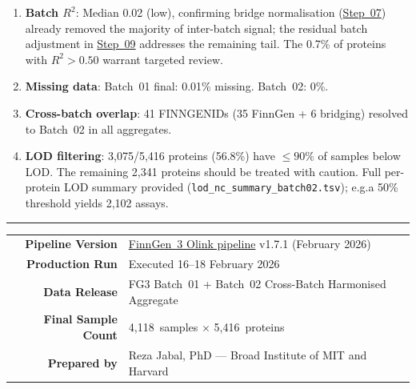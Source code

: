 \documentclass[11pt,a4paper]{article}
\newcommand{\pipelinelink}{%
  \href{https://github.com/FINNGEN/FinnGen3-proteomics-pipeline}%
       {FinnGen~3 Olink pipeline}}
\begin{document}
\begin{enumerate}
\item \textbf{Batch $R^{2}$}: Median 0.02 (low), confirming bridge
  normalisation (\href{https://github.com/FINNGEN/FinnGen3-proteomics-pipeline#pipeline-steps}{Step~07}) already removed the majority of inter-batch signal;
  the residual batch adjustment in \href{https://github.com/FINNGEN/FinnGen3-proteomics-pipeline#pipeline-steps}{Step~09} addresses the remaining tail.
  The 0.7\% of proteins with $R^{2} > 0.50$ warrant targeted review.


\item \textbf{Missing data}: Batch~01 final: 0.01\% missing. Batch~02: 0\%.

\item \textbf{Cross-batch overlap}: 41 FINNGENIDs (35 FinnGen + 6 bridging)
  resolved to Batch~02 in all aggregates.

\item \textbf{LOD filtering}: 3,075/5,416 proteins (56.8\%) have
  $\leq 90\%$ of samples below LOD. The remaining 2,341 proteins should be
  treated with caution. Full per-protein LOD summary provided
  (\texttt{lod\_nc\_summary\_batch02.tsv}); e.g.\@ a 50\% threshold yields
  2,102 assays.

\end{enumerate}

\vspace{0.5cm}
\noindent\rule{\linewidth}{0.4pt}
\vspace{0.3cm}

\noindent
\begin{tabular}{@{} r @{\quad} l @{}}
\textbf{Pipeline Version}  & \pipelinelink{} v1.7.1 (February 2026) \\
\textbf{Production Run}    & Executed 16--18 February 2026 \\
\textbf{Data Release}      & FG3 Batch~01 + Batch~02 Cross-Batch Harmonised Aggregate \\
\textbf{Final Sample Count} & 4,118~samples $\times$ 5,416~proteins \\
\textbf{Prepared by}        & Reza Jabal, PhD --- Broad Institute of MIT and Harvard \\
\end{tabular}
\end{document}
